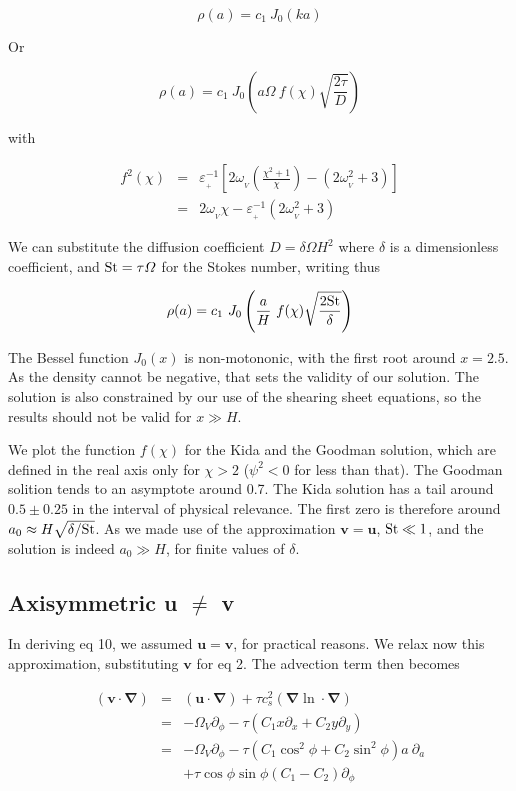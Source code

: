 \documentclass[apj]{emulateapj}
\renewcommand{\v}[1]{{\boldsymbol{#1}}} %
\newcommand{\del}{\v{\nabla}}
\newcommand{\grad}{\del}
\newcommand{\beq}{\begin{equation}}
\newcommand{\eeq}{\end{equation}}
\newcommand{\beqn}{\begin{eqnarray}}
\newcommand{\eeqn}{\end{eqnarray}}
\newcommand{\epsp}{\varepsilon_{_{+}}}
\begin{document}
\beq
\rho(a) = c_1 \ J_0 (ka)
\eeq

Or

\beq
\rho(a) = c_1 \ J_0 \left(a\varOmega \ f(\chi) \sqrt{\frac{2\tau}{D}} \right)
\eeq

\noindent with 

\beqn
f^2(\chi) &=& \epsp^{-1} \left[2\omega_{_V}\left(\frac{\chi^2+1}{\chi}\right) - (2\omega_{_V}^2 + 3) \right]\nonumber \\
          &=& 2\omega_{_V}\chi - \epsp^{-1}(2\omega_{_V}^2 + 3)
\eeqn

We can substitute the diffusion coefficient $D=\delta \varOmega H^2$ where 
$\delta$ is a dimensionless coefficient, and ${\rm St} = \tau\varOmega$ for 
the Stokes number, writing thus 

\beq
\rho(a) = c_1 \ J_0 \left(\frac{a}{H} \ f(\chi) \sqrt{\frac{2{\rm St}}{\delta}}\right)
\eeq 

The Bessel function $J_0(x)$ is
non-motononic, with the first root around $x=2.5$. As the density
cannot be negative, that sets the validity of our solution. The
solution is also constrained by our use of the shearing sheet
equations, so the results should not be valid for $x \gg H$. 
 
We plot the function $f(\chi)$ for the Kida and the Goodman
solution, which are defined in the real axis only for $\chi > 2$ ($\psi^2
< 0$ for less than that). The Goodman solition tends to an asymptote
around 0.7. The Kida solution has a  tail around $0.5\pm0.25$ in the
interval of physical relevance. The first zero is therefore around
$a_0 \approx H \sqrt{\delta/{\rm St}}$.  As we made use of the
approximation $\v{v}=\v{u}$, ${\rm St} \ll 1$, and the solution is indeed $a_0 \gg H$, for finite values of $\delta$.

\subsection{Axisymmetric u $\ne$ v }

In deriving eq 10, we assumed $\v{u}=\v{v}$, for practical reasons. We
relax now this approximation, substituting $\v{v}$ for eq 2. The
advection term then becomes 

\beqn
(\v{v}\cdot\del) &=& (\v{u}\cdot\del)  + \tau c_s^2 (\grad\ln \cdot
\del) \nonumber \\
&=& - \varOmega_V \partial_\phi - \tau \left( C_1 x \partial_x + C_2 y
  \partial_y\right) \nonumber \\
&=& - \varOmega_V \partial_\phi - \tau \left( C_1 \cos^2\phi   + C_2
  \sin^2\phi \right) a \ \partial_a \nonumber \\
&&+ \tau \cos\phi\sin\phi  (C_1 - C_2) \partial_\phi
\eeqn
\end{document}

